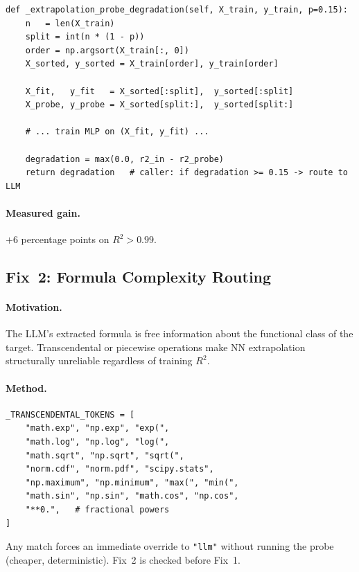 \documentclass[twoside,11pt]{article}
\begin{document}
\begin{lstlisting}[caption={Extrapolation probe core logic.}]
def _extrapolation_probe_degradation(self, X_train, y_train, p=0.15):
    n   = len(X_train)
    split = int(n * (1 - p))
    order = np.argsort(X_train[:, 0])
    X_sorted, y_sorted = X_train[order], y_train[order]

    X_fit,   y_fit   = X_sorted[:split],  y_sorted[:split]
    X_probe, y_probe = X_sorted[split:],  y_sorted[split:]

    # ... train MLP on (X_fit, y_fit) ...

    degradation = max(0.0, r2_in - r2_probe)
    return degradation   # caller: if degradation >= 0.15 -> route to LLM
\end{lstlisting}

\paragraph{Measured gain.} $+6$ percentage points on $R^2 > 0.99$.

\subsection{Fix~2: Formula Complexity Routing}

\paragraph{Motivation.}
The LLM's extracted formula is free information about the functional class of
the target.  Transcendental or piecewise operations make NN extrapolation
structurally unreliable regardless of training $R^2$.

\paragraph{Method.}

\begin{lstlisting}[caption={Transcendental token list.}]
_TRANSCENDENTAL_TOKENS = [
    "math.exp", "np.exp", "exp(",
    "math.log", "np.log", "log(",
    "math.sqrt", "np.sqrt", "sqrt(",
    "norm.cdf", "norm.pdf", "scipy.stats",
    "np.maximum", "np.minimum", "max(", "min(",
    "math.sin", "np.sin", "math.cos", "np.cos",
    "**0.",   # fractional powers
]
\end{lstlisting}

Any match forces an immediate override to \texttt{"llm"} without running the
probe (cheaper, deterministic).  Fix~2 is checked before Fix~1.
\end{document}
